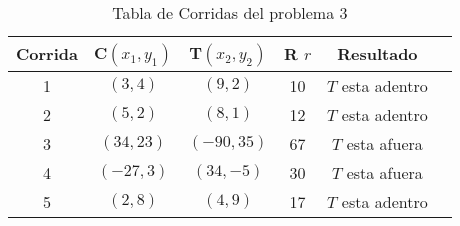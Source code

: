 \begin{table}[h!]
     \centering
     \caption{Tabla de Corridas del problema 3}\\

     \begin{tabular}{|c|c|c|c|c|c|}
     \hline
    Corrida & C$(x_{1}, y_{1})$& T$(x_{2}, y_{2})$  &  R $r$ & Resultado\\
    \hline
    1  &  $(3,4)$ & $(9,2)$ & 10 & $T$ esta adentro \\
    \hline
    2  &  $(5,2)$ & $(8,1)$ & 12 & $T$ esta adentro \\
    \hline
    3  &  $(34,23)$ & $(-90,35)$ & 67 & $T$ esta afuera \\
    \hline
    4  &  $(-27,3)$ & $(34,-5)$ & 30 & $T$ esta afuera \\
    \hline
    5 &  $(2,8)$ & $(4,9)$ & 17 & $T$ esta adentro \\
    \hline
     \end{tabular}
     \label{tab:my_label}
 \end{table}
